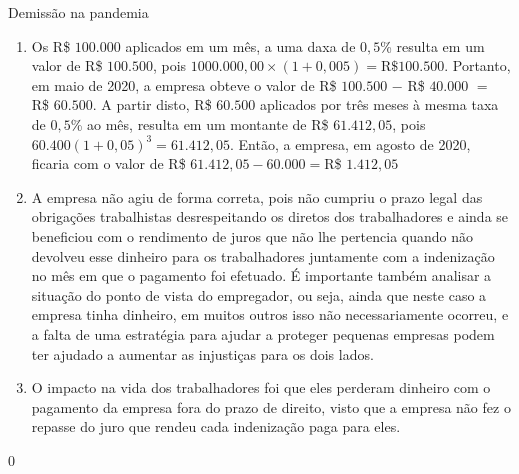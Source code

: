 \begin{answer}{Demissão na pandemia}
{
\begin{enumerate}
  \item Os R\$ $100.000$ aplicados em um mês, a uma daxa de $0{,}5$\% resulta em um valor de R\$ $100.500$, pois $1000.000{,}00\times(1+0{,}005)=\text{R\$ }100.500$. Portanto, em maio de 2020, a empresa obteve o valor de R\$ $100.500$ $-$ R\$ $40.000$ $=$ R\$ $60.500$. A partir disto, R\$ $60.500$ aplicados por três meses à mesma taxa de $0{,}5$\% ao mês, resulta em um montante de R\$ $61.412{,}05$, pois $60.400(1+0{,}05)^3=61.412{,}05$. Então, a empresa, em agosto de 2020, ficaria com o valor de R\$ $61.412{,}05-60.000=$R\$ $1.412{,}05$
  \item A empresa não agiu de forma correta, pois não cumpriu o prazo legal das obrigações trabalhistas desrespeitando os diretos dos trabalhadores e ainda se beneficiou com o rendimento de juros que não lhe pertencia quando não devolveu esse dinheiro para os trabalhadores juntamente com a indenização no mês em que o pagamento foi efetuado. É importante também analisar a situação do ponto de vista do empregador, ou seja, ainda que neste caso a empresa tinha dinheiro, em muitos outros isso não necessariamente ocorreu, e a falta de uma estratégia para ajudar a proteger pequenas empresas podem ter ajudado a aumentar as injustiças para os dois lados. 
  \item O impacto na vida dos trabalhadores foi que eles perderam dinheiro com o pagamento da empresa fora do prazo de direito, visto que a empresa não fez o repasse do juro que rendeu cada indenização paga para eles.
\end{enumerate}
}{0}
\end{answer}
